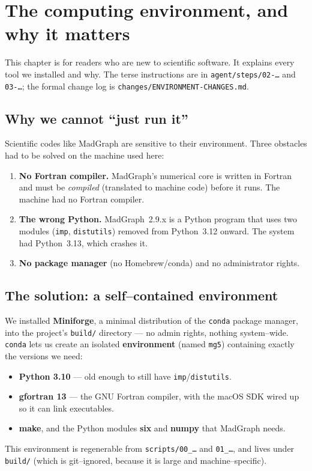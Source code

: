 \documentclass[11pt,oneside]{report}
\newcommand{\code}[1]{\texttt{#1}}
\begin{document}
\chapter{The computing environment, and why it matters}
\label{ch:env}

This chapter is for readers who are new to scientific software. It explains every tool we installed
and why. The terse instructions are in \code{agent/steps/02-\dots} and \code{03-\dots}; the formal
change log is \code{changes/ENVIRONMENT-CHANGES.md}.

\section{Why we cannot ``just run it''}
Scientific codes like MadGraph are sensitive to their environment. Three obstacles had to be solved
on the machine used here:
\begin{enumerate}[nosep]
  \item \textbf{No Fortran compiler.} MadGraph's numerical core is written in Fortran and must be
        \emph{compiled} (translated to machine code) before it runs. The machine had no Fortran
        compiler.
  \item \textbf{The wrong Python.} MadGraph~2.9.x is a Python program that uses two modules
        (\code{imp}, \code{distutils}) removed from Python~3.12 onward. The system had Python~3.13,
        which crashes it.
  \item \textbf{No package manager} (no Homebrew/conda) and no administrator rights.
\end{enumerate}

\section{The solution: a self--contained environment}
We installed \textbf{Miniforge}, a minimal distribution of the \code{conda} package manager, into
the project's \code{build/} directory --- no admin rights, nothing system--wide. \code{conda} lets
us create an isolated \textbf{environment} (named \code{mg5}) containing exactly the versions we
need:
\begin{itemize}[nosep]
  \item \textbf{Python 3.10} --- old enough to still have \code{imp}/\code{distutils}.
  \item \textbf{gfortran 13} --- the GNU Fortran compiler, with the macOS SDK wired up so it can
        link executables.
  \item \textbf{make}, and the Python modules \textbf{six} and \textbf{numpy} that MadGraph needs.
\end{itemize}
This environment is regenerable from \code{scripts/00\_\dots} and \code{01\_\dots}, and lives under
\code{build/} (which is git--ignored, because it is large and machine--specific).
\end{document}

